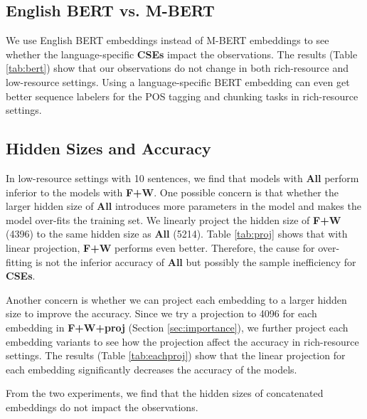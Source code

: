\documentclass[11pt,a4paper]{article}
\begin{document}
\subsection{English BERT vs. M-BERT}
We use English BERT embeddings instead of M-BERT embeddings to see whether the language-specific \textbf{CSEs} impact the observations. The results (Table \ref{tab:bert}) show that our observations do not change in both rich-resource and low-resource settings. Using a language-specific BERT embedding can even get better sequence labelers for the POS tagging and chunking tasks in rich-resource settings.

\subsection{Hidden Sizes and Accuracy}
In low-resource settings with 10 sentences, we find that models with \textbf{All} perform inferior to the models with \textbf{F+W}. One possible concern is that whether the larger hidden size of \textbf{All} introduces more parameters in the model and makes the model over-fits the training set. We linearly project the hidden size of \textbf{F+W} (4396) to the same hidden size as \textbf{All} (5214). Table \ref{tab:proj} shows that with linear projection, \textbf{F+W} performs even better. Therefore, the cause for over-fitting is not the inferior accuracy of \textbf{All} but possibly the sample inefficiency for \textbf{CSEs}. 

Another concern is whether we can project each embedding to a larger hidden size to improve the accuracy. Since we try a projection to 4096 for each embedding in \textbf{F+W+proj} (Section \ref{sec:importance}), we further project each embedding variants to see how the projection affect the accuracy in rich-resource settings. The results (Table \ref{tab:eachproj}) show that the linear projection for each embedding significantly decreases the accuracy of the models.

From the two experiments, we find that the hidden sizes of concatenated embeddings do not impact the observations.
\end{document}
